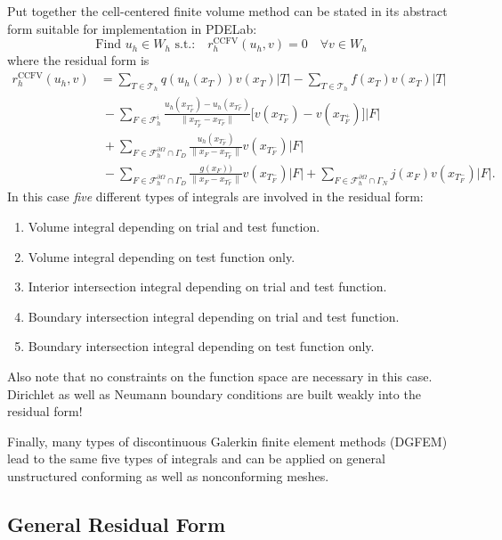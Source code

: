 \documentclass[a4paper,12pt]{article}
\begin{document}
Put together the cell-centered finite volume method can be stated
in its abstract form suitable for implementation in PDELab:
\begin{equation}
\boxed{ \text{Find $u_h\in W_h$ s.t.:} \quad r_h^{\text{CCFV}}(u_h,v) = 0 \quad \forall v \in W_h }
\end{equation}
where the residual form is
\begin{equation}
\label{eq:res_form_final}
\begin{split}
r_h^{\text{CCFV}}(u_h,v)
& = \sum_{T\in\mathcal{T}_h} q(u_h(x_T)) v(x_T) |T|
- \sum_{T\in\mathcal{T}_h} f(x_T) v(x_T) |T|\\
&\ - \sum_{F\in\mathcal{F}_h^i}
\frac{u_h(x_{T_F^+})-u_h(x_{T_F^-})}{\|x_{T_F^+} - x_{T_F^-}\|}
\bigl[v(x_{T_F^-}) - v(x_{T_F^+})\bigr] |F|\\
&\ + \sum_{F\in\mathcal{F}_h^{\partial\Omega}\cap\Gamma_D}
\frac{u_h(x_{T_F^-})}{\|x_{F} - x_{T_F^-}\|} v(x_{T_F^-}) |F| \\
&\ - \sum_{F\in\mathcal{F}_h^{\partial\Omega}\cap\Gamma_D}
\frac{g(x_{F}))}{\|x_{F} - x_{T_F^-}\|} v(x_{T_F^-}) |F|
+ \sum_{F\in\mathcal{F}_h^{\partial\Omega}\cap\Gamma_N} j(x_{F}) v(x_{T_F^-}) |F| .
\end{split}
\end{equation}
In this case \textit{five} different types of integrals are involved in the
residual form:
\begin{enumerate}
\item Volume integral depending on trial and test function.
\item Volume integral depending on test function only.
\item Interior intersection integral depending on trial and test function.
\item Boundary intersection integral depending on trial and test function.
\item Boundary intersection integral depending on test function only.
\end{enumerate}
Also note that no constraints on the function space are necessary in this case.
Dirichlet as well as Neumann boundary conditions are built weakly into the
residual form!

Finally, many types of discontinuous Galerkin finite element methods (DGFEM)
lead to the same five types of integrals and can be applied on general unstructured
conforming as well as nonconforming meshes.

\subsection*{General Residual Form}
\end{document}
